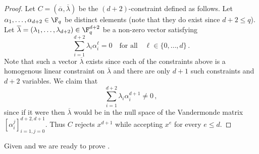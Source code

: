 \begin{proof}
Let $C=(\overline \alpha,\overline \lambda )$ be the $(d+2)$-constraint defined as follows.
Let $\alpha_1,\ldots,\alpha_{d+2} \in \F_q$ be distinct elements
(note that they do exist since $d+2 \leq q$).
Let ${\overline \lambda} = (\lambda_1,\ldots,\lambda_{d+2}) \in \F_q^{d+2}$
be a non-zero vector satisfying 
\[
\sum_{i=1}^{d+2} \lambda_i
\alpha_i^\ell = 0\quad\text{for all}\quad \ell \in \{0,\ldots,d\}\,.
\]
Note that such a vector ${\overline \lambda}$ exists since each of
the constraints above is a homogenous linear constraint on ${\overline \lambda}$
and there are only $d+1$ such constraints and $d+2$ variables.
We claim that
\[
\sum_{i=1}^{d+2} \lambda_i \alpha_i^{d+1} \ne 0\,,
\]
since
if it were then ${\overline \lambda}$ would be in the null space
of the Vandermonde matrix $[\alpha_i^j]_{i=1,j=0}^{d+2,d+1}$.
Thus $C$ rejects $x^{d+1}$ while accepting $x^{e}$
for every $e \leq d$.
\end{proof}

Given  and  we are ready to prove .

